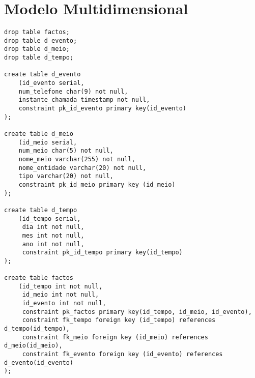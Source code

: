 \documentclass[10pt,a4paper]{article}
\begin{document}
\begin{verbatim}
\end{verbatim}

\section{Modelo Multidimensional}
\begin{verbatim}
drop table factos;
drop table d_evento;
drop table d_meio;
drop table d_tempo;

create table d_evento
    (id_evento serial,
    num_telefone char(9) not null,
    instante_chamada timestamp not null,
    constraint pk_id_evento primary key(id_evento)
);

create table d_meio
    (id_meio serial,
    num_meio char(5) not null,
    nome_meio varchar(255) not null,
    nome_entidade varchar(20) not null,
    tipo varchar(20) not null,
    constraint pk_id_meio primary key (id_meio)
);

create table d_tempo
    (id_tempo serial,
     dia int not null,
     mes int not null,
     ano int not null,
     constraint pk_id_tempo primary key(id_tempo)
);

create table factos
    (id_tempo int not null,
     id_meio int not null,
     id_evento int not null,
     constraint pk_factos primary key(id_tempo, id_meio, id_evento),
     constraint fk_tempo foreign key (id_tempo) references d_tempo(id_tempo),
     constraint fk_meio foreign key (id_meio) references d_meio(id_meio),
     constraint fk_evento foreign key (id_evento) references d_evento(id_evento)
);
\end{verbatim}
\end{document}
